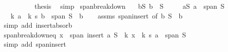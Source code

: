 \begin{isabellebody}
\ \ \ \ \isamarkupfalse%
\isanewline
\ \ \isamarkupfalse%
\ \isamarkupfalse%
\ {\isacharquery}{\kern0pt}thesis\ \isamarkupfalse%
\ simp\isanewline
{}\isamarkupfalse%
%
\endisatagproof
{\isafoldproof}%
%
\isadelimproof
\isanewline
%
\endisadelimproof
\isanewline
{}\isamarkupfalse%
\ span{\isacharunderscore}{\kern0pt}breakdown{\isacharcolon}{\kern0pt}\isanewline
\ \ \ bS{\isacharcolon}{\kern0pt}\ {\isachardoublequoteopen}b\ {\isasymin}\ S{\isachardoublequoteclose}\isanewline
\ \ \ \ \ aS{\isacharcolon}{\kern0pt}\ {\isachardoublequoteopen}a\ {\isasymin}\ span\ S{\isachardoublequoteclose}\isanewline
\ \ \ {\isachardoublequoteopen}{\isasymexists}k{\isachardot}{\kern0pt}\ a\ {\isacharminus}{\kern0pt}\ k\ {\isacharasterisk}{\kern0pt}s\ b\ {\isasymin}\ span\ {\isacharparenleft}{\kern0pt}S\ {\isacharminus}{\kern0pt}\ {\isacharbraceleft}{\kern0pt}b{\isacharbraceright}{\kern0pt}{\isacharparenright}{\kern0pt}{\isachardoublequoteclose}\isanewline
%
\isadelimproof
\ \ %
\endisadelimproof
%
\isatagproof
{}\isamarkupfalse%
\ assms\ span{\isacharunderscore}{\kern0pt}insert\ {\isacharbrackleft}{\kern0pt}of\ b\ {\isachardoublequoteopen}S\ {\isacharminus}{\kern0pt}\ {\isacharbraceleft}{\kern0pt}b{\isacharbraceright}{\kern0pt}{\isachardoublequoteclose}{\isacharbrackright}{\kern0pt}\isanewline
\ \ \isamarkupfalse%
\ {\isacharparenleft}{\kern0pt}simp\ add{\isacharcolon}{\kern0pt}\ insert{\isacharunderscore}{\kern0pt}absorb{\isacharparenright}{\kern0pt}%
\endisatagproof
{\isafoldproof}%
%
\isadelimproof
\isanewline
%
\endisadelimproof
\isanewline
{}\isamarkupfalse%
\ span{\isacharunderscore}{\kern0pt}breakdown{\isacharunderscore}{\kern0pt}eq{\isacharcolon}{\kern0pt}\ {\isachardoublequoteopen}x\ {\isasymin}\ span\ {\isacharparenleft}{\kern0pt}insert\ a\ S{\isacharparenright}{\kern0pt}\ {\isasymlongleftrightarrow}\ {\isacharparenleft}{\kern0pt}{\isasymexists}k{\isachardot}{\kern0pt}\ x\ {\isacharminus}{\kern0pt}\ k\ {\isacharasterisk}{\kern0pt}s\ a\ {\isasymin}\ span\ S{\isacharparenright}{\kern0pt}{\isachardoublequoteclose}\isanewline
%
\isadelimproof
\ \ %
\endisadelimproof
%
\isatagproof
{}\isamarkupfalse%
\ {\isacharparenleft}{\kern0pt}simp\ add{\isacharcolon}{\kern0pt}\ span{\isacharunderscore}{\kern0pt}insert{\isacharparenright}{\kern0pt}%
\endisatagproof
{\isafoldproof}%
%
\isadelimproof
\isanewline
%
\endisadelimproof
\isanewline
{}\isamarkupfalse%

\end{isabellebody}
